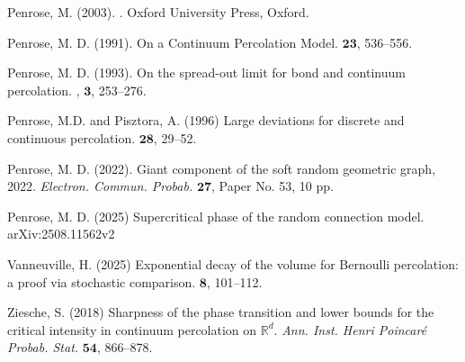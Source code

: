 \documentclass[a4paper,12pt]{scrartcl}
\theoremstyle{definition}
\theoremstyle{remark}
\begin{document}
\begin{thebibliography}{}
Penrose, M. (2003).
.
\newblock %
Oxford University Press, Oxford. %

Penrose, M. D. (1991).
\newblock On a {C}ontinuum {P}ercolation {M}odel.
 $\mathbf{23}$,
536--556.

Penrose, M. D.  (1993).
\newblock On the {s}pread-{o}ut {l}imit for {b}ond and {c}ontinuum
{p}ercolation.
, $\mathbf{3}$,
253--276.

Penrose, M.D. and Pisztora, A. (1996)
\newblock Large deviations for discrete and continuous percolation.
 $\mathbf{28}$, 29--52.


Penrose, M. D. (2022).
\newblock Giant component of the soft random geometric graph, 2022.
\newblock
{\em Electron. Commun. Probab.} $\mathbf{27}$,
Paper No. 53, 10 pp.

Penrose, M. D. (2025)
\newblock Supercritical phase of the random connection model.
\newblock
arXiv:2508.11562v2

Vanneuville, H. (2025)
\newblock Exponential decay of the volume for Bernoulli percolation: a proof via stochastic comparison.
 $\mathbf{8}$, 101--112.

Ziesche, S. (2018)
\newblock Sharpness of the phase transition and lower bounds for the critical intensity in continuum percolation on $\mathbb R^d$.
{\em Ann. Inst. Henri Poincaré Probab. Stat.} $\mathbf{54}$,
866--878.


\end{thebibliography}
\end{document}
